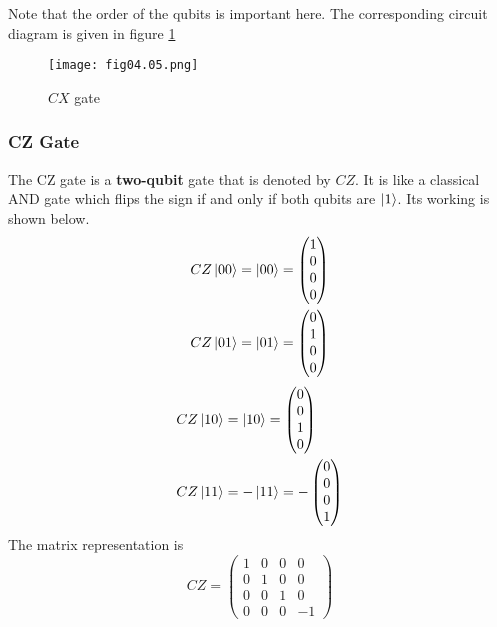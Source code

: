 Note that the order of the qubits is important here. The corresponding circuit diagram is given in figure \ref{Fig:4.5}
\begin{figure}[!htb]
   \begin{minipage}{\textwidth}
     \centering
     \texttt{[image: fig04.05.png]}
     \caption{$CX$ gate}
     \label{Fig:4.5}
   \end{minipage}
\end{figure}

\subsubsection*{CZ Gate}
The CZ gate is a \textbf{two-qubit} gate that is denoted by $CZ$. It is like a classical AND gate which flips the sign if and only if both qubits are $\left\vert 1\right\rangle$. Its working is shown below.
\begin{equation*}
\begin{split}
CZ\left\vert 00\right\rangle&=\left\vert 00\right\rangle=
\begin{pmatrix}
1\\
0\\
0\\
0
\end{pmatrix}\\
CZ\left\vert 01\right\rangle&=\left\vert 01\right\rangle=
\begin{pmatrix}
0\\
1\\
0\\
0
\end{pmatrix}
\end{split}
\end{equation*}
\begin{equation*}
\begin{split}
CZ\left\vert 10\right\rangle&=\left\vert 10\right\rangle=
\begin{pmatrix}
0\\
0\\
1\\
0
\end{pmatrix}\\
CZ\left\vert 11\right\rangle&=-\left\vert 11\right\rangle=
-\begin{pmatrix}
0\\
0\\
0\\
1
\end{pmatrix}\\
\end{split}
\end{equation*}
The matrix representation is
\begin{equation*}
CZ=
\begin{pmatrix}
1&0&0&0\\
0&1&0&0\\
0&0&1&0\\
0&0&0&-1
\end{pmatrix}
\end{equation*}
